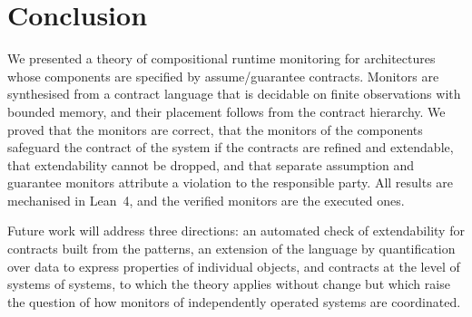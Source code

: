 \section{Conclusion}\label{sec:conclusion}

We presented a theory of compositional runtime monitoring for architectures whose components are specified by assume/guarantee contracts. Monitors are synthesised from a contract language that is decidable on finite observations with bounded memory, and their placement follows from the contract hierarchy. We proved that the monitors are correct, that the monitors of the components safeguard the contract of the system if the contracts are refined and extendable, that extendability cannot be dropped, and that separate assumption and guarantee monitors attribute a violation to the responsible party. All results are mechanised in Lean~4, and the verified monitors are the executed ones. 

Future work will address three directions: an automated check of extendability for contracts built from the patterns, an extension of the language by quantification over data to express properties of individual objects, and contracts at the level of systems of systems, to which the theory applies without change but which raise the question of how monitors of independently operated systems are coordinated.
